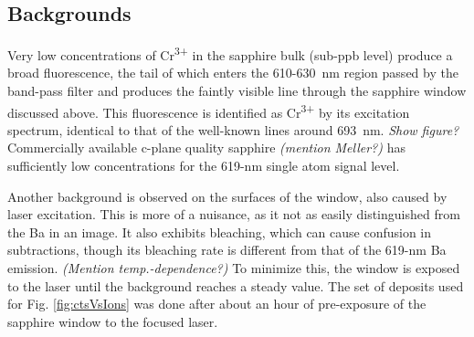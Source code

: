 \documentclass[aps,pra,reprint,superscriptaddress]{revtex4-1}
\begin{document}



\subsection{Backgrounds}
\label{sec:backgrounds}

Very low concentrations of Cr\textsuperscript{3+} in the sapphire bulk (sub-ppb level) produce a broad fluorescence, the tail of which enters the 610-630~nm region passed by the band-pass filter and produces the faintly visible line through the sapphire window discussed above.  This fluorescence is identified as Cr\textsuperscript{3+} by its excitation spectrum, identical to that of the well-known lines around 693~nm.  \emph{\color{gray}Show figure?}  Commercially available c-plane quality sapphire \emph{\color{gray}(mention Meller?)} has sufficiently low concentrations for the 619-nm single atom signal level.

Another background is observed on the surfaces of the window, also caused by laser excitation.  This is more of a nuisance, as it not as easily distinguished from the Ba in an image.  It also exhibits bleaching, which can cause confusion in subtractions, though its bleaching rate is different from that of the 619-nm Ba emission.  \emph{\color{gray}(Mention temp.-dependence?)}  To minimize this, the window is exposed to the laser until the background reaches a steady value.  The set of deposits used for Fig. \ref{fig:ctsVsIons} was done after about an hour of pre-exposure of the sapphire window to the focused laser.
\end{document}

